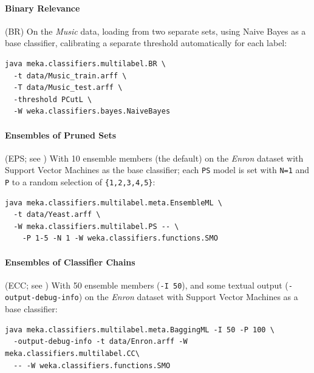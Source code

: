 \documentclass[11pt]{article}
\begin{document}


\paragraph{Binary Relevance} (BR) On the \textit{Music} data, loading from two separate sets, using Naive Bayes as a base classifier, calibrating a separate threshold automatically for each label: 
\begin{lstlisting}
java meka.classifiers.multilabel.BR \
  -t data/Music_train.arff \
  -T data/Music_test.arff \
  -threshold PCutL \
  -W weka.classifiers.bayes.NaiveBayes
\end{lstlisting}

\paragraph{Ensembles of Pruned Sets} (EPS; see \cite{EPS}) With 10 ensemble members (the default) on the \textit{Enron} dataset with Support Vector Machines as the base classifier; each \texttt{PS} model is set with \texttt{N=1} and \texttt{P} to a random selection of \texttt{\{1,2,3,4,5\}}:

\begin{lstlisting}
java meka.classifiers.multilabel.meta.EnsembleML \
  -t data/Yeast.arff \
  -W meka.classifiers.multilabel.PS -- \
    -P 1-5 -N 1 -W weka.classifiers.functions.SMO
\end{lstlisting}

\paragraph{Ensembles of Classifier Chains} (ECC; see \cite{ECC2}) With 50 ensemble members (\texttt{-I 50}), and some textual output (\texttt{-output-debug-info}) on the \textit{Enron} dataset with Support Vector Machines as a base classifier:
\begin{lstlisting}
java meka.classifiers.multilabel.meta.BaggingML -I 50 -P 100 \
  -output-debug-info -t data/Enron.arff -W meka.classifiers.multilabel.CC\ 
  -- -W weka.classifiers.functions.SMO
\end{lstlisting}
\end{document}
